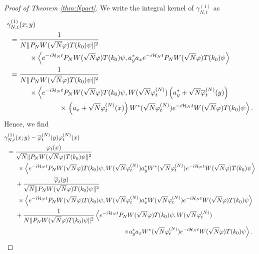 \documentclass[11pt,a4paper]{article}
\newcommand{\cH}{{\cal H}}
\begin{document}
 \begin{proof}[Proof of Theorem \ref{thm:Npart}]
We write the integral kernel of $\gamma^{(1)}_{N,t}$ as
\[ \begin{split} \gamma^{(1)}_{N,t} &(x;y) \\ = \; &\frac{1}{N \| P_N W(\sqrt{N} \varphi) T(k_0) \psi \|^2} \\ & \hspace{.5cm} \times \left\langle  
e^{-i\cH_N t}  P_N W(\sqrt{N} \varphi) T(k_0) \psi , a_y^* a_x  e^{-i\cH_N t}  P_N W(\sqrt{N} \varphi) T(k_0) \psi \right\rangle \\  = \; & \frac{1}{N \| P_N W(\sqrt{N} \varphi) T(k_0) \psi \|^2} \\ & \hspace{.5cm}  \times \left\langle  
e^{-i\cH_N t}  P_N W(\sqrt{N} \varphi) T(k_0) \psi , W (\sqrt{N} \varphi_t^{(N)}) \left(a_y^* + \sqrt{N} \overline{\varphi}_t^{(N)} (y) \right) \right. \\  & \hspace{2cm} \times \left. \left( a_x + \sqrt{N} \varphi_t^{(N)} (x)\right) W^*(\sqrt{N} \varphi_t^{(N)})  e^{-i\cH_N t}  W(\sqrt{N} \varphi) T(k_0) \psi \right\rangle. \end{split} \]
Hence, we find
\[ \begin{split} 
 \gamma^{(1)}_{N,t} &(x;y) - \overline{\varphi}_t^{(N)} (y)\varphi_t^{(N)} (x) \\  = \; & \frac{\varphi_t (x)}{\sqrt{N} \| P_N W(\sqrt{N} \varphi) T(k_0) \psi \|^2} 
\\ & \hspace{.1cm}  \times \left\langle  
e^{-i\cH_N t}  P_N W(\sqrt{N} \varphi) T(k_0) \psi , W (\sqrt{N} \varphi_t^{(N)}) a_y^* W^*(\sqrt{N} \varphi_t^{(N)} ) e^{-i\cH_N t}  W(\sqrt{N} \varphi) T(k_0) \psi \right\rangle \\ &+ \frac{\overline{\varphi}_t (y)}{\sqrt{N} \| P_N W(\sqrt{N} \varphi) T(k_0) \psi \|^2} \\ & \hspace{.1cm}  \times \left\langle  
e^{-i\cH_N t}  P_N W(\sqrt{N} \varphi) T(k_0) \psi , W (\sqrt{N} \varphi_t^{(N)}) a_x^* W(\sqrt{N} \varphi_t^{(N)} ) e^{-i\cH_N t}  W(\sqrt{N} \varphi) T(k_0) \psi \right\rangle\\ &+ \frac{1}{N \| P_N W(\sqrt{N} \varphi) T(k_0) \psi \|^2} \left\langle  e^{-i\cH_N t}  P_N W(\sqrt{N} \varphi) T(k_0) \psi , W (\sqrt{N} \varphi_t^{(N)}) \right. \\ & \left. \hspace{6cm}  \times  a^*_y a_x W^*(\sqrt{N} \varphi_t^{(N)})  e^{-i\cH_N t}  W(\sqrt{N} \varphi) T(k_0) \psi \right\rangle. 

\end{split}\]
\end{proof}
\end{document}
